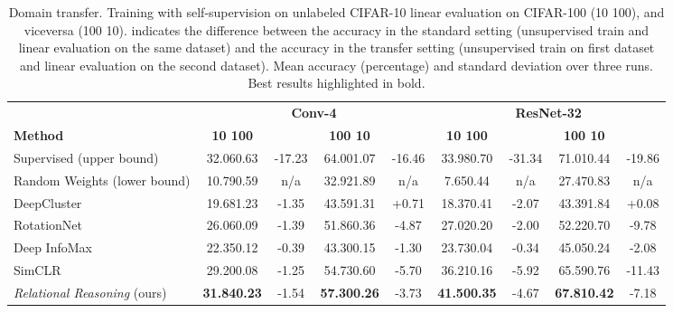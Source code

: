 \documentclass{article}
\begin{document}
\begin{table}[H]
 \caption{Domain transfer. Training with self-supervision on unlabeled CIFAR-10 linear evaluation on CIFAR-100 (10  100), and viceversa (100  10).  indicates the difference between the accuracy in the standard setting (unsupervised train and linear evaluation on the same dataset) and the accuracy in the transfer setting (unsupervised train on first dataset and linear evaluation on the second dataset). Mean accuracy (percentage) and standard deviation over three runs. Best results highlighted in bold.}
 \label{tab:transfer_learning}
 \begin{adjustbox}{width=\columnwidth,center}
  \centering
  \begin{tabular}{lcccccccc}
    \toprule
& \multicolumn{4}{c}{\textbf{Conv-4}} & \multicolumn{4}{c}{\textbf{ResNet-32}} \\
    \cmidrule[0.1pt](r){2-5} \cmidrule[0.1pt](l){6-9}
    \textbf{Method} &
    \textbf{10  100} &  & \textbf{100  10} &  &
    \textbf{10  100} &  & \textbf{100  10} & \\
    \midrule
Supervised (upper bound) & 
    32.06\small{0.63} & -17.23 & 64.00\small{1.07} & -16.46 &
    33.98\small{0.70} & -31.34 & 71.01\small{0.44} & -19.86 \\
    Random Weights (lower bound) & 
    10.79\small{0.59} & n/a & 32.92\small{1.89} & n/a &
    7.65\small{0.44} & n/a & 27.47\small{0.83} & n/a \\
    \cmidrule(l){1-9}
    DeepCluster \citep{caron2018deep} & 
    19.68\small{1.23} & -1.35 & 43.59\small{1.31} & +0.71 &
    18.37\small{0.41} & -2.07 & 43.39\small{1.84} & +0.08 \\
    RotationNet \citep{gidaris2018unsupervised} & 
    26.06\small{0.09} & -1.39 & 51.86\small{0.36} & -4.87 &
    27.02\small{0.20} & -2.00 & 52.22\small{0.70} & -9.78 \\
    Deep InfoMax \citep{hjelm2018learning} & 
    22.35\small{0.12} & -0.39 & 43.30\small{0.15} & -1.30 &
    23.73\small{0.04} & -0.34 & 45.05\small{0.24} & -2.08 \\
    SimCLR \citep{chen2020simple} &
    29.20\small{0.08} & -1.25 & 54.73\small{0.60} & -5.70 &
    36.21\small{0.16} & -5.92 & 65.59\small{0.76} & -11.43 \\
    \emph{Relational Reasoning} (ours) & 
    \textbf{31.84\small{0.23}} & -1.54 & \textbf{57.30\small{0.26}} & -3.73 &
    \textbf{41.50\small{0.35}} & -4.67 & \textbf{67.81\small{0.42}} & -7.18 \\
    \bottomrule
  \end{tabular}
 \end{adjustbox}
\end{table}
\end{document}
